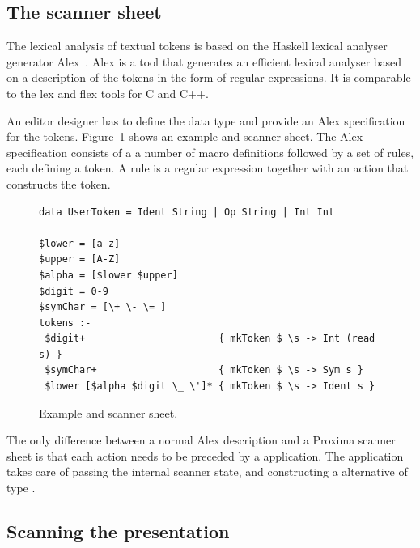 \documentclass[12pt]{article}
\begin{document}

\subsection{The scanner sheet}

The lexical analysis of textual tokens is based on the Haskell lexical analyser generator Alex~\cite{marlow07alex}. Alex is a tool that generates an efficient lexical analyser based on a description of the tokens in the form of regular expressions. It is comparable to the lex and flex tools for C and C++.

An editor designer has to define the data type  and provide an Alex specification for the tokens. Figure~\ref{fig:scannerSheet} shows an example  and scanner sheet. The Alex specification consists of a a number of macro definitions followed by a set of rules, each defining a token. A rule is a regular expression together with an action that constructs the token.

\begin{figure}
\begin{center}
\begin{footnotesize}
\begin{verbatim}
data UserToken = Ident String | Op String | Int Int

$lower = [a-z]
$upper = [A-Z]
$alpha = [$lower $upper]
$digit = 0-9		
$symChar = [\+ \- \= ]
tokens :-
 $digit+                       { mkToken $ \s -> Int (read s) }
 $symChar+                     { mkToken $ \s -> Sym s }
 $lower [$alpha $digit \_ \']* { mkToken $ \s -> Ident s }
\end{verbatim} %
\end{footnotesize}
\caption{Example  and scanner sheet.} \label{fig:scannerSheet} 
\end{center}
\end{figure}

The only difference between a normal Alex description and a Proxima scanner sheet is that each action needs to be preceded by a  application. The  application takes care of passing the internal scanner state, and constructing a  alternative of type . %



\subsection{Scanning the presentation}
\end{document}

